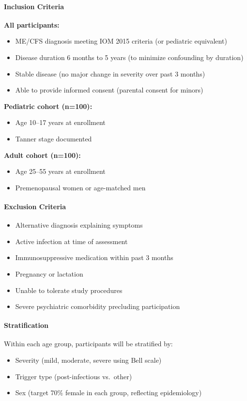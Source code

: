 \paragraph{Inclusion Criteria}
\textbf{All participants:}
\begin{itemize}
    \item ME/CFS diagnosis meeting IOM 2015 criteria (or pediatric equivalent)
    \item Disease duration 6 months to 5 years (to minimize confounding by duration)
    \item Stable disease (no major change in severity over past 3 months)
    \item Able to provide informed consent (parental consent for minors)
\end{itemize}

\textbf{Pediatric cohort (n=100):}
\begin{itemize}
    \item Age 10--17 years at enrollment
    \item Tanner stage documented
\end{itemize}

\textbf{Adult cohort (n=100):}
\begin{itemize}
    \item Age 25--55 years at enrollment
    \item Premenopausal women or age-matched men
\end{itemize}

\paragraph{Exclusion Criteria}
\begin{itemize}
    \item Alternative diagnosis explaining symptoms
    \item Active infection at time of assessment
    \item Immunosuppressive medication within past 3 months
    \item Pregnancy or lactation
    \item Unable to tolerate study procedures
    \item Severe psychiatric comorbidity precluding participation
\end{itemize}

\paragraph{Stratification}
Within each age group, participants will be stratified by:
\begin{itemize}
    \item Severity (mild, moderate, severe using Bell scale)
    \item Trigger type (post-infectious vs.\ other)
    \item Sex (target 70\% female in each group, reflecting epidemiology)
\end{itemize}

